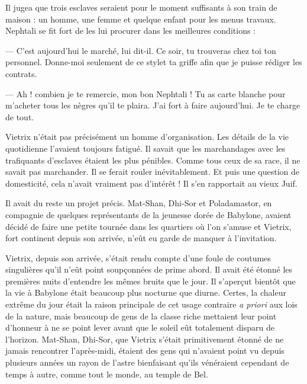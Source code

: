\documentclass[a4paper, 11pt, oneside, polutonikogreek, french]{article}
\begin{document}
\bigskip
\centerline{\EightStarTaper}
\centerline{\EightStarTaper\EightStarTaper}
\bigskip

Il jugea que trois esclaves seraient pour le moment suffisants à son train de maison : un homme, une femme et quelque enfant pour les menus travaux. Nephtali se fit fort de les lui procurer dans les meilleures conditions :

--- C'est aujourd'hui le marché, lui dit-il. Ce soir, tu trouveras chez toi ton personnel. Donne-moi seulement de ce stylet ta griffe afin que je puisse rédiger les contrats.

--- Ah ! combien je te remercie, mon bon Nephtali ! Tu as carte blanche pour m'acheter tous les nègres qu'il te plaira. J'ai fort à faire aujourd'hui. Je te charge de tout.

Vietrix n'était pas précisément un homme d'organisation. Les détails de la vie quotidienne l'avaient toujours fatigué. Il savait que les marchandages avec les trafiquants d'esclaves étaient les plus pénibles. Comme tous ceux de sa race, il ne savait pas marchander. Il se ferait rouler inévitablement. Et puis une question de domesticité, cela n'avait vraiment pas d'intérêt ! Il s'en rapportait au vieux Juif.

Il avait du reste un projet précis. Mat-Shan, Dhi-Sor et Poladamastor, en compagnie de quelques représentants de la jeunesse dorée de Babylone, avaient décidé de faire une petite tournée dans les quartiers où l'on s'amuse et Vietrix, fort continent depuis son arrivée, n'eût eu garde de manquer à l'invitation.

\bigskip
\centerline{\EightStarTaper}
\centerline{\EightStarTaper\EightStarTaper}
\bigskip

Vietrix, depuis son arrivée, s'était rendu compte d'une foule de coutumes singulières qu'il n'eût point soupçonnées de prime abord. Il avait été étonné les premières nuits d'entendre les mêmes bruits que le jour. Il s'aperçut bientôt que la vie à Babylone était beaucoup plus nocturne que diurne. Certes, la chaleur extrême du jour était la raison principale de cet usage contraire \emph{a priori} aux lois de la nature, mais beaucoup de gens de la classe riche mettaient leur point d'honneur à ne se point lever avant que le soleil eût totalement disparu de l'horizon. Mat-Shan, Dhi-Sor, que Vietrix s'était primitivement étonné de ne jamais rencontrer l'après-midi, étaient des gens qui n'avaient point vu depuis plusieurs années un rayon de l'astre bienfaisant qu'ils vénéraient cependant de temps à autre, comme tout le monde, au temple de Bel.
\end{document}
